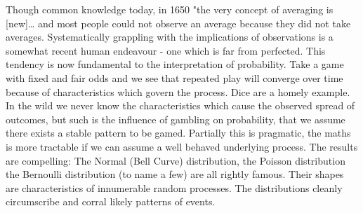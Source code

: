 \documentclass[]{tufte-book}
\theoremstyle{definition}
\theoremstyle{definition}
\theoremstyle{definition}
\theoremstyle{remark}
\begin{document}
Though common knowledge today, in 1650 "the very concept of averaging is {[}new{]}\ldots{} and most people could not observe an average because they did not take averages.\citep{HackingEmergence} Systematically grappling with the implications of observations is a somewhat recent human endeavour - one which is far from perfected. This tendency is now fundamental to the interpretation of probability. Take a game with fixed and fair odds and we see that repeated play will converge over time because of characteristics which govern the process. Dice are a homely example. In the wild we never know the characteristics which cause the observed spread of outcomes, but such is the influence of gambling on probability, that we assume there exists a stable pattern to be gamed. Partially this is pragmatic, the maths is more tractable if we can assume a well behaved underlying process. The results are compelling: The Normal (Bell Curve) distribution, the Poisson distribution the Bernoulli distribution (to name a few) are all rightly famous. Their shapes are characteristics of innumerable random processes. The distributions cleanly circumscribe and corral likely patterns of events.
\end{document}
